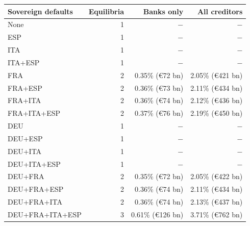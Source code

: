 \begin{tabular*}{\textwidth}{@{\extracolsep{\fill}}lrrr@{}}
\toprule
Sovereign defaults & Equilibria & Banks only & All creditors \\
\midrule
None & 1 & $-$ & $-$ \\
ESP & 1 & $-$ & $-$ \\
ITA & 1 & $-$ & $-$ \\
ITA+ESP & 1 & $-$ & $-$ \\
FRA & 2 & 0.35\% (\euro{}72 bn) & 2.05\% (\euro{}421 bn) \\
FRA+ESP & 2 & 0.36\% (\euro{}73 bn) & 2.11\% (\euro{}434 bn) \\
FRA+ITA & 2 & 0.36\% (\euro{}74 bn) & 2.12\% (\euro{}436 bn) \\
FRA+ITA+ESP & 2 & 0.37\% (\euro{}76 bn) & 2.19\% (\euro{}450 bn) \\
DEU & 1 & $-$ & $-$ \\
DEU+ESP & 1 & $-$ & $-$ \\
DEU+ITA & 1 & $-$ & $-$ \\
DEU+ITA+ESP & 1 & $-$ & $-$ \\
DEU+FRA & 2 & 0.35\% (\euro{}72 bn) & 2.05\% (\euro{}422 bn) \\
DEU+FRA+ESP & 2 & 0.36\% (\euro{}74 bn) & 2.11\% (\euro{}434 bn) \\
DEU+FRA+ITA & 2 & 0.36\% (\euro{}74 bn) & 2.13\% (\euro{}437 bn) \\
DEU+FRA+ITA+ESP & 3 & 0.61\% (\euro{}126 bn) & 3.71\% (\euro{}762 bn) \\
\bottomrule
\end{tabular*}
